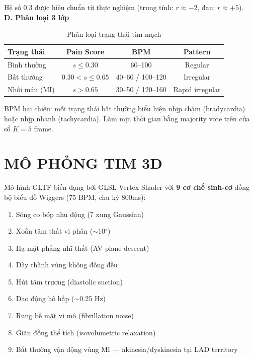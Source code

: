 \documentclass[journal]{IEEEtran}
\begin{document}
Hệ số 0.3 được hiệu chuẩn từ thực nghiệm (trung tính: $r \approx -2$, đau: $r \approx +5$).\\

\textbf{D. Phân loại 3 lớp}\\

\begin{table}[H]
\centering
\caption{Phân loại trạng thái tim mạch}
\begin{tabular}{lccc}
\hline
\textbf{Trạng thái} & \textbf{Pain Score} & \textbf{BPM} & \textbf{Pattern} \\
\hline
Bình thường   & $s \leq 0.30$        & 60--100 & Regular \\
Bất thường    & $0.30 < s \leq 0.65$ & 40--60 / 100--120 & Irregular \\
Nhồi máu (MI) & $s > 0.65$          & 30--50 / 120--160 & Rapid irregular \\
\hline
\end{tabular}
\label{tab:classification}
\end{table}

BPM hai chiều: mỗi trạng thái bất thường biểu hiện nhịp chậm (bradycardia) hoặc nhịp nhanh (tachycardia). Làm mịn thời gian bằng majority vote trên cửa sổ $K{=}5$ frame.

\section{MÔ PHỎNG TIM 3D}

Mô hình GLTF biến dạng bởi GLSL Vertex Shader với \textbf{9 cơ chế sinh-cơ} đồng bộ biểu đồ Wiggers (75 BPM, chu kỳ 800ms):

\begin{enumerate}
    \item Sóng co bóp nhu động (7 xung Gaussian)
    \item Xoắn tâm thất vi phân ($\sim$10$^\circ$)
    \item Hạ mặt phẳng nhĩ-thất (AV-plane descent)
    \item Dày thành vùng không đồng đều
    \item Hút tâm trương (diastolic suction)
    \item Dao động hô hấp ($\sim$0.25 Hz)
    \item Rung bề mặt vi mô (fibrillation noise)
    \item Giãn đồng thể tích (isovolumetric relaxation)
    \item Bất thường vận động vùng MI — akinesia/dyskinesia tại LAD territory
\end{enumerate}
\end{document}
